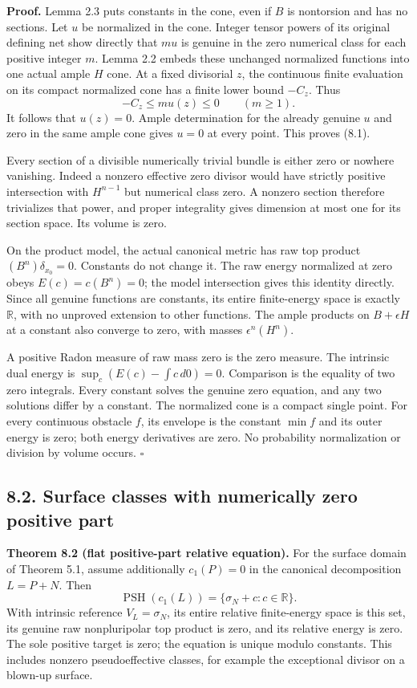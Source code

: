 \documentclass[
  10pt,
]{article}
\begin{document}
\textbf{Proof.} Lemma 2.3 puts constants in the cone, even if \(B\) is
nontorsion and has no sections. Let \(u\) be normalized in the cone.
Integer tensor powers of its original defining net show directly that
\(mu\) is genuine in the zero numerical class for each positive integer
\(m\). Lemma 2.2 embeds these unchanged normalized functions into one
actual ample \(H\) cone. At a fixed divisorial \(z\), the continuous
finite evaluation on its compact normalized cone has a finite lower
bound \(-C_z\). Thus \[
 -C_z\leq m u(z)\leq0 \qquad(m\geq1).
\] It follows that \(u(z)=0\). Ample determination for the already
genuine \(u\) and zero in the same ample cone gives \(u=0\) at every
point. This proves (8.1).

Every section of a divisible numerically trivial bundle is either zero
or nowhere vanishing. Indeed a nonzero effective zero divisor would have
strictly positive intersection with \(H^{n-1}\) but numerical class
zero. A nonzero section therefore trivializes that power, and proper
integrality gives dimension at most one for its section space. Its
volume is zero.

On the product model, the actual canonical metric has raw top product
\((B^n)\delta_{x_0}=0\). Constants do not change it. The raw energy
normalized at zero obeys \(E(c)=c(B^n)=0\); the model intersection gives
this identity directly. Since all genuine functions are constants, its
entire finite-energy space is exactly \(\mathbb R\), with no unproved
extension to other functions. The ample products on \(B+\epsilon H\) at
a constant also converge to zero, with masses \(\epsilon^n(H^n)\).

A positive Radon measure of raw mass zero is the zero measure. The
intrinsic dual energy is \(\sup_c(E(c)-\int c\,d0)=0\). Comparison is
the equality of two zero integrals. Every constant solves the genuine
zero equation, and any two solutions differ by a constant. The
normalized cone is a compact single point. For every continuous obstacle
\(f\), its envelope is the constant \(\min f\) and its outer energy is
zero; both energy derivatives are zero. No probability normalization or
division by volume occurs. \(\square\)

\subsection{8.2. Surface classes with numerically zero positive
part}\label{surface-classes-with-numerically-zero-positive-part}

\textbf{Theorem 8.2 (flat positive-part relative equation).} For the
surface domain of Theorem 5.1, assume additionally \(c_1(P)=0\) in the
canonical decomposition \(L=P+N\). Then \[
 \operatorname{PSH}(c_1(L))=\{\sigma_N+c:c\in\mathbb R\}.
                                                               \tag{8.2}
\] With intrinsic reference \(V_L=\sigma_N\), its entire relative
finite-energy space is this set, its genuine raw nonpluripolar top
product is zero, and its relative energy is zero. The sole positive
target is zero; the equation is unique modulo constants. This includes
nonzero pseudoeffective classes, for example the exceptional divisor on
a blown-up surface.
\end{document}
